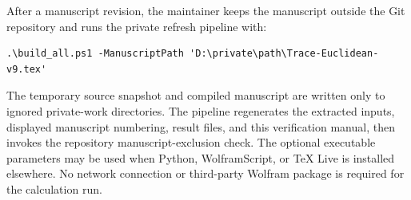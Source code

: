 \documentclass[12pt,a4paper]{amsart}
\theoremstyle{remark}
\theoremstyle{definition}
\begin{document}
After a manuscript revision, the maintainer keeps the manuscript outside the
Git repository and runs the private refresh pipeline with:
\begin{Verbatim}[fontsize=\small,breaklines=true]
.\build_all.ps1 -ManuscriptPath 'D:\private\path\Trace-Euclidean-v9.tex'
\end{Verbatim}
The temporary source snapshot and compiled manuscript are written only to
ignored private-work directories.  The pipeline regenerates the extracted
inputs, displayed manuscript numbering, result files, and this verification
manual, then invokes the repository manuscript-exclusion check.  The optional
executable parameters may be used when Python, WolframScript, or TeX Live is
installed elsewhere.  No network connection or third-party Wolfram package is
required for the calculation run.
\end{document}
